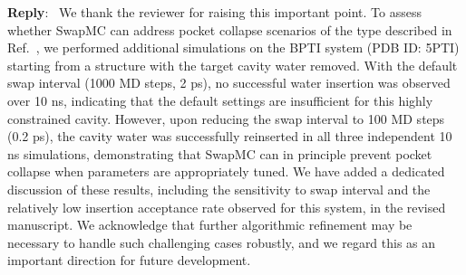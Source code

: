 \documentclass[doublespace,prb,aps]{article}
\newcounter{reviewer}
\newcounter{point}[reviewer]
\newenvironment{reply}
   {\medskip \noindent \color{black} \begin{sf}\textbf{Reply}:\  }
   {\medskip \par \end{sf}}
\begin{document}
\begin{reply}
We thank the reviewer for raising this important point. 
To assess whether SwapMC can address pocket collapse scenarios of the type described in Ref.~\cite{Ge2022}, 
we performed additional simulations on the BPTI system (PDB ID: 5PTI) starting from a structure with the target cavity water removed. 
With the default swap interval (1000 MD steps, 2 ps), 
no successful water insertion was observed over 10 ns, 
indicating that the default settings are insufficient for this highly constrained cavity. 
However, upon reducing the swap interval to 100 MD steps (0.2 ps), 
the cavity water was successfully reinserted in all three independent 10 ns simulations, 
demonstrating that SwapMC can in principle prevent pocket collapse when parameters are appropriately tuned. 
We have added a dedicated discussion of these results, 
including the sensitivity to swap interval and the relatively low insertion acceptance rate observed for this system, in the revised manuscript. 
We acknowledge that further algorithmic refinement may be necessary to handle such challenging cases robustly, 
and we regard this as an important direction for future development.
\end{reply}
\end{document}
